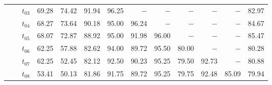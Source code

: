 \begin{table}[ht]
\begin{tabular}{@{}l l l *{10}{r}@{}}
 & & $t_{03}$ & 69.28 & 74.42 & 91.94 & 96.25 & $-$ & $-$ & $-$ & $-$ & $-$ & 82.97 \\
 & & $t_{04}$ & 68.27 & 73.64 & 90.18 & 95.00 & 96.24 & $-$ & $-$ & $-$ & $-$ & 84.67 \\
 & & $t_{05}$ & 68.07 & 72.87 & 88.92 & 95.00 & 91.98 & 96.00 & $-$ & $-$ & $-$ & 85.47 \\
 & & $t_{06}$ & 62.25 & 57.88 & 82.62 & 94.00 & 89.72 & 95.50 & 80.00 & $-$ & $-$ & 80.28 \\
 & & $t_{07}$ & 62.25 & 52.45 & 82.12 & 92.50 & 90.23 & 95.25 & 79.50 & 92.73 & $-$ & 80.88 \\
 & & $t_{08}$ & 53.41 & 50.13 & 81.86 & 91.75 & 89.72 & 95.25 & 79.75 & 92.48 & 85.09 & 79.94 \\
\bottomrule
\end{tabular}
\end{table}
